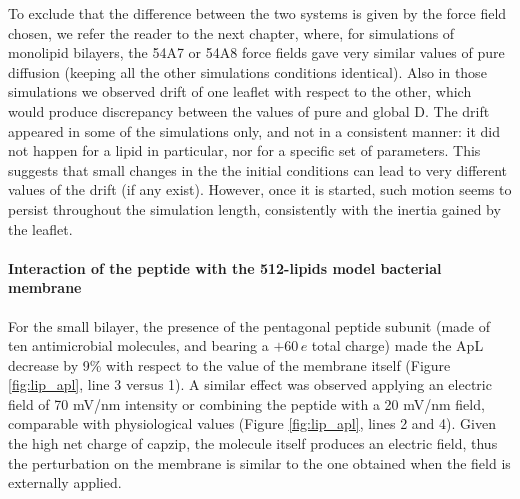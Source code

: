 To exclude that the difference between the two systems is given by the force field chosen, we refer the reader to the next chapter, where, for simulations of monolipid bilayers, the 54A7 or 54A8 force fields gave very similar values of pure diffusion (keeping all the other simulations conditions identical).
%
Also in those simulations we observed drift of one leaflet with respect to the other, which would produce discrepancy between the values of pure and global D. The drift appeared in some of the simulations only, and not in a consistent manner: it did not happen for a lipid in particular, nor for a specific set of parameters. This suggests that small changes in the the initial conditions can lead to very different values of the drift (if any exist).
However, once it is started, such motion seems to persist throughout the simulation length, consistently with the inertia gained by the leaflet.


\paragraph{Interaction of the peptide with the 512-lipids model bacterial membrane}
For the small bilayer, the presence of the pentagonal peptide subunit (made of ten antimicrobial molecules, and bearing a $+60\,e$ total charge) made the ApL decrease by 9\% with respect to the value of the membrane itself (Figure \ref{fig:lip_apl}, line 3 versus 1).
%
A similar effect was observed applying an electric field of 70 mV/nm intensity or combining the peptide with a 20 mV/nm field, comparable with physiological values (Figure \ref{fig:lip_apl}, lines 2 and 4).
%
Given the high net charge of capzip, the molecule itself produces an electric field, thus the perturbation on the membrane is similar to the one obtained when the field is externally applied.


